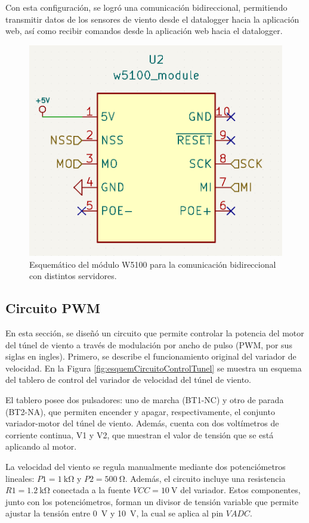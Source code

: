 Con esta configuración, se logró una comunicación bidireccional, permitiendo transmitir datos de los sensores de viento desde el datalogger hacia la aplicación web, así como recibir comandos desde la aplicación web hacia el datalogger.
\begin{figure}[H]
    \centering
    \includegraphics[width=0.7\linewidth]{Figuras/datalogger/Hardware/esquemEthernet.png}
    \caption{Esquemático del módulo W5100 para la comunicación bidireccional con distintos servidores.}
    \label{fig:esquemEthernet}
\end{figure}


\subsection{Circuito PWM}\label{sec:circuitoPWM}


En esta sección, se diseñó un circuito que permite controlar la potencia del motor del túnel de viento a través de modulación por ancho de pulso (PWM, por sus siglas en ingles). Primero, se describe el funcionamiento original del variador de velocidad. En la Figura \ref{fig:esquemCircuitoControlTunel} se muestra un esquema del tablero de control del variador de velocidad del túnel de viento.

El tablero posee dos pulsadores: uno de marcha (BT1-NC) y otro de parada (BT2-NA), que permiten encender y apagar, respectivamente, el conjunto variador-motor del túnel de viento. Además, cuenta con dos voltímetros de corriente continua, V1 y V2, que muestran el valor de tensión que se está aplicando al motor.

La velocidad del viento se regula manualmente mediante dos potenciómetros lineales: $P1 = \SI{1}{\kilo\ohm}$ y $P2 = \SI{500}{\ohm}$. Además, el circuito incluye una resistencia $R1 = \SI{1.2}{\kilo\ohm}$ conectada a la fuente $VCC = \SI{10}{\volt}$ del variador. Estos componentes, junto con los potenciómetros, forman un divisor de tensión variable que permite ajustar la tensión entre \SI{0}{\volt} y \SI{10}{\volt}, la cual se aplica al pin $VADC$.


